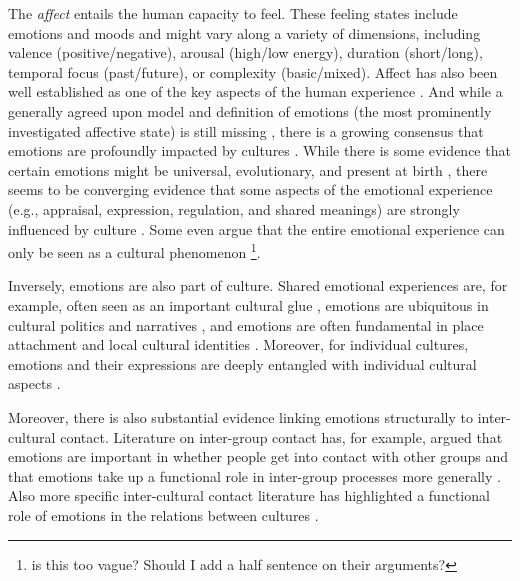 \documentclass[nobib]{tufte-handout}
\begin{document}
The \textit{affect} entails the human capacity to feel. These feeling states include emotions and moods and might vary along a variety of dimensions, including valence (positive/negative), arousal (high/low energy), duration (short/long), temporal focus (past/future), or complexity (basic/mixed). Affect has also been well established as one of the key aspects of the human experience \citep{FeldmanBarrett2007}. And while a generally agreed upon model and definition of emotions (the most prominently investigated affective state) is still missing \citep[e.g.,][]{Scarantino2016}, there is a growing consensus that emotions are profoundly impacted by cultures \citep[e.g.,][]{Holodynski2012}. While there is some evidence that certain emotions might be universal, evolutionary, and present at birth \citep[e.g.,][]{Ekman1999, FeldmanBarrett2006}, there seems to be converging evidence that some aspects of the emotional experience (e.g., appraisal, expression, regulation, and shared meanings) are strongly influenced by culture \citep[][]{Holodynski2012, Matsumoto2012, Kitayama2006}. Some even argue that the entire emotional experience can only be seen as a cultural phenomenon \citep[e.g.,][]{Mesquita2003, Boiger2018}\footnote{is this too vague? Should I add a half sentence on their arguments?}. 

Inversely, emotions are also part of culture. Shared emotional experiences are, for example, often seen as an important cultural glue \citep{Rensmann2004, Kitayama1994}, emotions are ubiquitous in cultural politics and narratives \citep{Ahmed2014}, and emotions are often fundamental in place attachment and local cultural identities \citep{Smith2016c}. Moreover, for individual cultures, emotions and their expressions are deeply entangled with individual cultural aspects \citep[e.g., see][for a discussion of how different emotions lay at the heart of Chinese cultural elements]{Sundararajan2015}. 

Moreover, there is also substantial evidence linking emotions structurally to inter-cultural contact. Literature on inter-group contact has, for example, argued that emotions are important in whether people get into contact with other groups \citep{Esses2002} and that emotions take up a functional role in inter-group processes more generally \citep{Iyer2008}. Also more specific inter-cultural contact literature has highlighted a functional role of emotions in the relations between cultures \citep[e.g.,][]{Stephan1992}.
\end{document}
